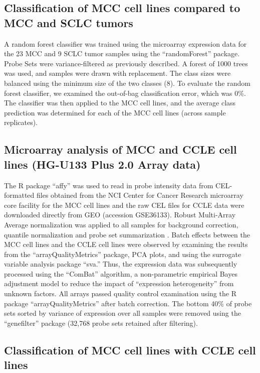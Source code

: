 \documentclass[10pt]{article}
\begin{document}
\subsection*{Classification of MCC cell lines compared to MCC and SCLC tumors}

A random forest classifier was trained using the microarray expression data for the 23 MCC and 9 SCLC tumor samples using the ``randomForest'' package.
Probe Sets were variance-filtered as previously described.
A forest of 1000 trees was used, and samples were drawn with replacement.
The class sizes were balanced using the minimum size of the two classes (8).
To evaluate the random forest classifier, we examined the out-of-bag classification error, which was 0\%.
The classifier was then applied to the MCC cell lines, and the average class prediction was determined for each of the MCC cell lines (across sample replicates).

\subsection*{Microarray analysis of MCC and CCLE cell lines (HG-U133 Plus 2.0 Array data)}

The R package ``affy'' \citep{Gautier2004Affyanalysis} was used to read in probe intensity data from CEL-formatted files obtained from the NCI Center for Cancer Research microarray core facility for the MCC cell lines and the raw CEL files for CCLE data were downloaded directly from GEO (accession GSE36133).
Robust Multi-Array Average normalization was applied to all samples for background correction, quantile normalization and probe set summarization \citep{McCall2010Frozen}.
Batch effects between the MCC cell lines and the CCLE cell lines were observed by examining the results from the ``arrayQualityMetrics'' package, PCA plots, and using the surrogate variable analysis package ``sva.''
Thus, the expression data was subsequently processed using the ``ComBat'' algorithm, a non-parametric empirical Bayes adjustment model \citep{Johnson2007Adjusting} to reduce the impact of ``expression heterogeneity'' from unknown factors.
All arrays passed quality control examination using the R package ``arrayQualityMetrics'' after batch correction.
The bottom 40\% of probe sets sorted by variance of expression over all samples were removed using the ``genefilter'' package (32,768 probe sets retained after filtering).

\subsection*{Classification of MCC cell lines with CCLE cell lines}
\end{document}
